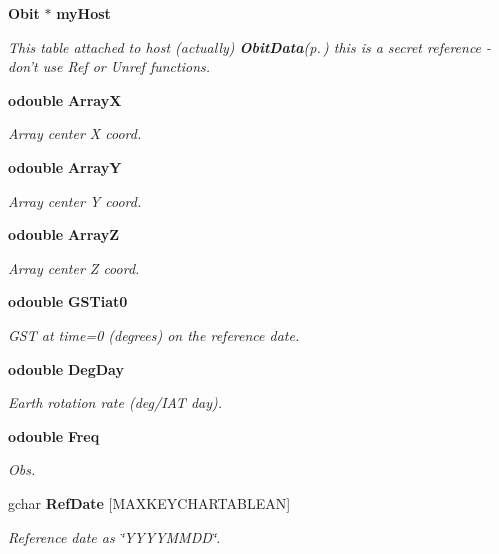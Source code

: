 \begin{CompactItemize}
{\bf Obit} $\ast$ {\bf my\-Host}
\begin{CompactList}\small\item\em This table attached to host (actually) {\bf Obit\-Data}{\rm (p.\,\pageref{structObitData})} this is a secret reference - don't use Ref or Unref functions. \item\end{CompactList}\item 
{\bf odouble} {\bf Array\-X}
\begin{CompactList}\small\item\em Array center X coord. \item\end{CompactList}\item 
{\bf odouble} {\bf Array\-Y}
\begin{CompactList}\small\item\em Array center Y coord. \item\end{CompactList}\item 
{\bf odouble} {\bf Array\-Z}
\begin{CompactList}\small\item\em Array center Z coord. \item\end{CompactList}\item 
{\bf odouble} {\bf GSTiat0}
\begin{CompactList}\small\item\em GST at time=0 (degrees) on the reference date. \item\end{CompactList}\item 
{\bf odouble} {\bf Deg\-Day}
\begin{CompactList}\small\item\em Earth rotation rate (deg/IAT day). \item\end{CompactList}\item 
{\bf odouble} {\bf Freq}
\begin{CompactList}\small\item\em Obs. \item\end{CompactList}\item 
gchar {\bf Ref\-Date} [MAXKEYCHARTABLEAN]
\begin{CompactList}\small\item\em Reference date as \char`\"{}YYYYMMDD\char`\"{}. \item\end{CompactList}\item 

\end{CompactItemize}
